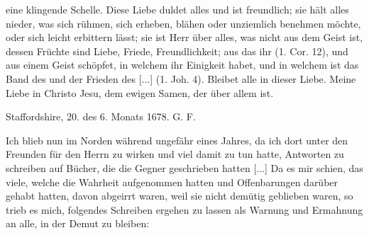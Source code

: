 {    eine klingende Schelle. Diese Liebe duldet alles und ist 
    freundlich; sie hält alles nieder, was sich rühmen, sich erheben,
    blähen oder unziemlich benehmen möchte, oder sich leicht erbittern
    lässt; sie ist Herr über alles, was nicht aus dem Geist ist, dessen
    Früchte sind Liebe, Friede, Freundlichkeit; aus das ihr  (1. Cor. 12),
    und aus einem Geist schöpfet, in welchem ihr Einigkeit habet,
    und in welchem ist das Band des  und
    der Frieden des  [...] 
    (1. Joh. 4). Bleibet alle in 
    dieser Liebe. Meine Liebe in Christo
    Jesu, dem ewigen Samen, der über allem ist.
    \bigskip 

    \begin{flushright}
    Staffordshire, 20. des 6. Monats 1678. G. F.\end{flushright}
}


Ich blieb nun im Norden während ungefähr eines Jahres,
da ich dort unter den Freunden für den Herrn zu wirken
und viel damit zu tun hatte, Antworten zu schreiben auf Bücher,
die die Gegner geschrieben hatten [...] Da es mir schien, das
viele, welche die Wahrheit aufgenommen hatten und Offenbarungen
darüber gehabt hatten, davon abgeirrt waren, weil sie nicht
demütig geblieben waren, so trieb es mich, folgendes Schreiben
ergehen zu lassen als Warnung und Ermahnung an alle, in der
Demut zu bleiben:

